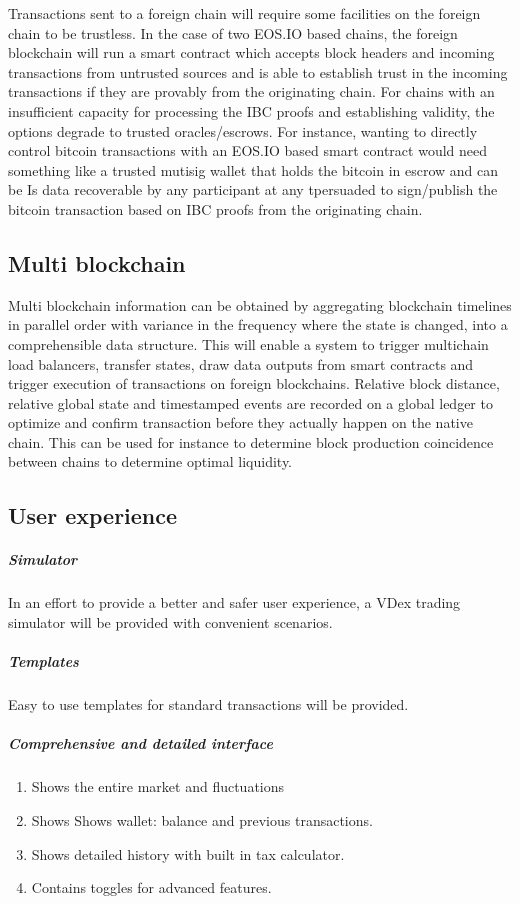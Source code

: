 \documentclass[]{article}
\begin{document}
	Transactions sent to a foreign chain will require some facilities on the foreign chain to be trustless. 
	In the case of two EOS.IO based chains, the foreign blockchain will run a smart contract which accepts block headers and incoming transactions from untrusted sources and is able to establish trust in the incoming transactions if they are provably from the originating chain. 
	For chains with an insufficient capacity for processing the IBC proofs and establishing validity, the options degrade to trusted oracles/escrows.
	For instance, wanting to directly control bitcoin transactions with an EOS.IO based smart contract would need something like a trusted mutisig wallet that holds the bitcoin in escrow and can be 	Is data recoverable by any participant at any tpersuaded to sign/publish the bitcoin transaction based on IBC proofs from the originating chain.\cite{3}
	
	
	\subsection{Multi blockchain}
	Multi blockchain information can be obtained by aggregating blockchain timelines in parallel order with variance in the frequency where the state is changed, into a comprehensible data structure.
	This will enable a system to trigger multichain load balancers, transfer states, draw data outputs from smart contracts and trigger execution of transactions on foreign blockchains. 
	Relative block distance, relative global state and timestamped events are recorded on a
	global ledger to optimize and confirm transaction before they actually happen on the native chain.
	This can be used for instance to determine block production coincidence between chains to determine optimal liquidity.
	
	\subsection{User experience}
	\subparagraph{Simulator}
	In an effort to provide a better and safer user experience, 
	a VDex trading simulator will be provided with convenient scenarios.
	\subparagraph{Templates}
	Easy to use templates for standard transactions will be provided.
	\subparagraph{Comprehensive and detailed interface}
	\begin{enumerate}
		\item Shows the entire market and fluctuations
		\item Shows Shows wallet: balance and previous transactions.
		\item Shows detailed history with built in tax calculator.
		\item Contains toggles for advanced features.		 
	\end{enumerate}
	
\end{document}
